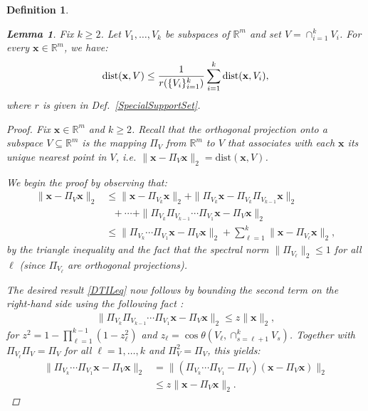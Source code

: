 \documentclass[9pt,twocolumn]{pnas-new}
\newtheorem{lemma}{Lemma}
\newtheorem{definition}{Definition}
\begin{document}
\begin{definition}
\begin{lemma}\label{DistanceToIntersectionLemma}
Fix $k \geq 2$. Let $V_1, \ldots, V_k$ be subspaces of $\mathbb{R}^m$ and set $V = \cap_{i = 1}^k V_i$. For every $\mathbf{x} \in \mathbb{R}^m$, we have:
\begin{align}\label{DTILeq}
\text{\rm dist}(\mathbf{x}, V) \leq \frac{1}{r(\{V_i\}_{i = 1}^k)} \sum_{i=1}^k \text{\rm dist}(\mathbf{x}, V_i),
\end{align}
where $r$ is given in Def.~\ref{SpecialSupportSet}.
\end{lemma}
\begin{proof} 
Fix $\mathbf{x} \in \mathbb{R}^m$ and $k \geq 2$. Recall that the orthogonal projection onto a subspace $V \subseteq \mathbb{R}^m$ is the mapping $\Pi_V$ from $\mathbb{R}^m$ to $V$ that associates with each $\mathbf{x}$ its unique nearest point in $V$, i.e. $\|\mathbf{x} - \Pi_V\mathbf{x}\|_2 = \text{dist}(\mathbf{x}, V)$.

We begin the proof by observing that:
\begin{align}\label{f}
\|\mathbf{x} - \Pi_V\mathbf{x}\|_2 &\leq \|\mathbf{x} - \Pi_{V_k} \mathbf{x}\|_2 + \|\Pi_{V_k}  \mathbf{x} - \Pi_{V_k}\Pi_{V_{k-1}}\mathbf{x}\|_2 \nonumber \\
&\ \ \ + \cdots + \|\Pi_{V_k} \Pi_{V_{k-1}}\cdots \Pi_{V_1} \mathbf{x} - \Pi_V \mathbf{x}\|_2 \nonumber \\
&\leq \|\Pi_{V_k}\cdots\Pi_{V_{1}} \mathbf{x} - \Pi_V \mathbf{x}\|_2 + \sum_{\ell=1}^k \|\mathbf{x} - \Pi_{V_{\ell}} \mathbf{x}\|_2,
\end{align}
%
by the triangle inequality and the fact that the spectral norm $\|\Pi_{V_{\ell}}\|_2 \leq 1$ for all $\ell$ (since $\Pi_{V_{\ell}}$ are orthogonal projections).

The desired result \eqref{DTILeq} now follows by bounding the second term on the right-hand side using the following fact \cite[Thm.~9.33]{Deutsch12}:
\begin{align}
\|\Pi_{V_k}\Pi_{V_{k-1}}\cdots\Pi_{V_1} \mathbf{x} - \Pi_V\mathbf{x}\|_2 \leq z \|\mathbf{x}\|_2, %
\end{align}
for \mbox{$z^2= 1 - \prod_{\ell =1}^{k-1}(1-z_{\ell}^2)$} and \mbox{$z_{\ell} = \cos\theta\left(V_{\ell}, \cap_{s=\ell+1}^k V_s\right)$}. Together with $\Pi_{V_\ell} \Pi_V = \Pi_V$ for all $\ell = 1, \ldots, k$ and $\Pi_V^2 = \Pi_V$, this yields:
\begin{align*}
\|\Pi_{V_k} \cdots \Pi_{V_1}\mathbf{x}  - \Pi_V \mathbf{x} \|_2 
&= \|\left( \Pi_{V_k} \cdots\Pi_{V_1} - \Pi_V \right) (\mathbf{x} - \Pi_V\mathbf{x})\|_2 \\
&\leq z\|\mathbf{x} - \Pi_V\mathbf{x}\|_2.
\end{align*}


\end{proof}
\end{definition}
\end{document}
